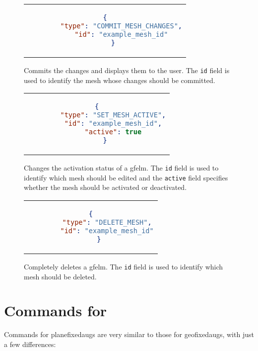 \begin{figure}
  \centering
  \begin{tabular}{c}
  \begin{lstlisting}[language=json]
    {
        "type": "COMMIT_MESH_CHANGES",
        "id": "example_mesh_id"
    }
  \end{lstlisting}
  \end{tabular}
  \caption{Commits the changes and displays them to the user. The \texttt{id} field is used to identify the mesh whose changes should be committed.}\label{lst:gf_commit}
\end{figure}

\begin{figure}
  \centering
  \begin{tabular}{c}
  \begin{lstlisting}[language=json]
    {
        "type": "SET_MESH_ACTIVE",
        "id": "example_mesh_id",
        "active": true
    }
  \end{lstlisting}
  \end{tabular}
  \caption{Changes the activation status of a \gls{gfelm}. The \texttt{id} field is used to identify which mesh should be edited and the \texttt{active} field specifies whether the mesh should be activated or deactivated.}\label{lst:gf_activate}
\end{figure}

\begin{figure}
  \centering
  \begin{tabular}{c}
  \begin{lstlisting}[language=json]
    {
        "type": "DELETE_MESH",
        "id": "example_mesh_id"
    }
  \end{lstlisting}
  \end{tabular}
  \caption{Completely deletes a \gls{gfelm}. The \texttt{id} field is used to identify which mesh should be deleted.}\label{lst:gf_delete}
\end{figure}

\section{Commands for }

Commands for \glspl{planefixedaug} are very similar to those for \glspl{geofixedaug}, with just a few differences:


